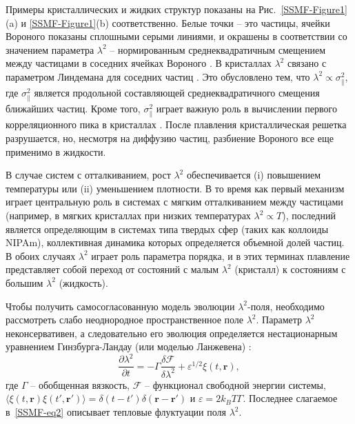 Примеры кристаллических и жидких структур показаны на Рис.~\ref{SSMF-Figure1}(a) и \ref{SSMF-Figure1}(b) соответственно.
Белые точки -- это частицы, ячейки Вороного показаны сплошными серыми линиями, и окрашены в соответствии со значением параметра $\lambda^2$ -- нормированным среднеквадратичным смещением между частицами в соседних ячейках Вороного \cite{10.1021/acs.jpcc.7b09317}. %
В кристаллах $\lambda^2$ связано с параметром Линдемана для соседних частиц \cite{10.1016/0375-9601(85)90617-6}.
Это обусловлено тем, что $\lambda^2\propto \sigma_ \| ^ 2 $, где $ \sigma_ \| ^ 2 $ является продольной составляющей среднеквадратичного смещения ближайших частиц.
Кроме того, $ \sigma_ \| ^ 2 $ играет важную роль в вычислении первого корреляционного пика в кристаллах \cite{10.1063/1.4869863, 10.1063/1.4926945, 10.1088/0953-8984/28/23/235401, 10.1039/c7sm02429k, 10.1063/1.5116176}.
После плавления кристаллическая решетка разрушается, но, несмотря на диффузию частиц, разбиение Вороного все еще применимо в жидкости.

В случае систем с отталкиванием, рост $\lambda^2$ обеспечивается (i) повышением температуры или (ii) уменьшением плотности.
В то время как первый механизм играет центральную роль в системах с мягким отталкиванием между частицами (например, в мягких кристаллах при низких температурах $\lambda^2\propto T $), последний является определяющим в системах типа твердых сфер (таких как коллоиды NIPAm), коллективная динамика которых определяется объемной долей частиц.
В обоих случаях $\lambda^2$ играет роль параметра порядка, и в этих терминах плавление представляет собой переход от состояний с малым $\lambda^2$ (кристалл) к состояниям с большим $\lambda^2$ (жидкость).

Чтобы получить самосогласованную модель эволюции $ \lambda^2$-поля,
необходимо рассмотреть слабо неоднородное пространственное поле $\lambda^2$.
Параметр $\lambda ^ 2$ неконсервативен, а следовательно его эволюция определяется нестационарным уравнением Гинзбурга-Ландау (или моделью Ланжевена) \cite{book.desai}:
\begin{equation}
\label{SSMF-eq4}
\frac{\partial \lambda^2}{\partial t} = -\Gamma \frac{\delta \mathcal{F}}{\delta \lambda^2} + \varepsilon^{1/2}\xi(t,\mathbf{r}),
\end{equation}
где $\Gamma$ -- обобщенная вязкость, $ \mathcal{F} $ -- функционал свободной энергии системы, $\langle \xi(t,\mathbf{r})\xi(t',\mathbf{r}')\rangle = \delta(t-t')\delta(\mathbf{r}-\mathbf{r}')$ и $\varepsilon = 2k_BT\Gamma$.
Последнее слагаемое в~\eqref{SSMF-eq2} описывает тепловые флуктуации поля $\lambda^2$.

